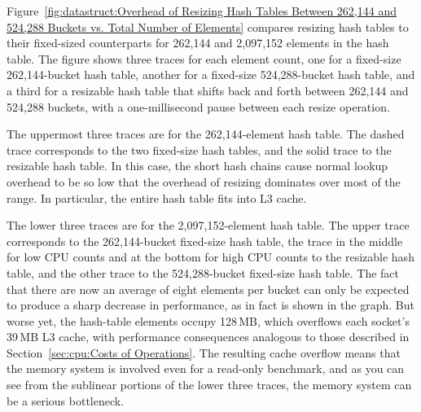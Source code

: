 Figure~\ref{fig:datastruct:Overhead of Resizing Hash Tables Between 262,144 and 524,288 Buckets vs. Total Number of Elements}
compares resizing hash tables to their fixed-sized counterparts
for 262,144 and 2,097,152 elements in the hash table.
The figure shows three traces for each element count, one
for a fixed-size 262,144-bucket hash table, another for a
fixed-size 524,288-bucket hash table, and a third for a resizable
hash table that shifts back and forth between 262,144 and 524,288
buckets, with a one-millisecond pause between each resize operation.

The uppermost three traces are for the 262,144-element hash table.
The dashed trace corresponds to the two fixed-size hash tables,
and the solid trace to the resizable hash table.
In this case, the short hash chains cause normal lookup overhead
to be so low that the overhead of resizing dominates over most
of the range.
In particular, the entire hash table fits into L3 cache.

The lower three traces are for the 2,097,152-element hash table.
The upper trace corresponds to the 262,144-bucket fixed-size hash table,
the trace in the middle for low CPU counts and at the bottom for high
CPU counts to the resizable hash table, and the other trace
to the 524,288-bucket fixed-size hash table.
The fact that there are now an average of eight elements per bucket
can only be expected to produce a sharp decrease in performance,
as in fact is shown in the graph.
But worse yet, the hash-table elements occupy 128\,MB, which overflows
each socket's 39\,MB L3 cache, with performance consequences analogous
to those described in Section~\ref{sec:cpu:Costs of Operations}.
The resulting cache overflow means that the memory system is involved
even for a read-only benchmark, and as you can see from the sublinear
portions of the lower three traces, the memory system can be a serious
bottleneck.

